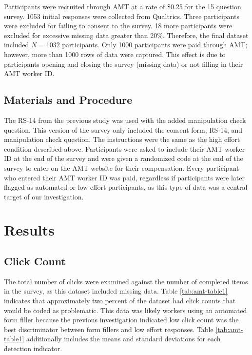 \documentclass[english,man]{apa6}
\theoremstyle{definition}
\theoremstyle{definition}
\theoremstyle{definition}
\theoremstyle{remark}
\begin{document}
Participants were recruited through AMT at a rate of \$0.25 for the 15
question survey. 1053 initial responses were collected from Qualtrics.
Three participants were excluded for failing to consent to the survey.
18 more participants were excluded for excessive missing data greater
than 20\%. Therefore, the final dataset included \emph{N} = 1032
participants. Only 1000 participants were paid through AMT; however,
more than 1000 rows of data were captured. This effect is due to
participants opening and closing the survey (missing data) or not
filling in their AMT worker ID.

\subsection{Materials and Procedure}\label{materials-and-procedure}

The RS-14 from the previous study was used with the added manipulation
check question. This version of the survey only included the consent
form, RS-14, and manipulation check question. The instructions were the
same as the high effort condition described above. Participants were
asked to include their AMT worker ID at the end of the survey and were
given a randomized code at the end of the survey to enter on the AMT
website for their compensation. Every participant who entered their AMT
worker ID was paid, regardless if participants were later flagged as
automated or low effort participants, as this type of data was a central
target of our investigation.

\section{Results}\label{results-2}

\subsection{Click Count}\label{click-count-2}

The total number of clicks were examined against the number of completed
items in the survey, as this dataset included missing data. Table
\ref{tab:amt-table1} indicates that approximately two percent of the
dataset had click counts that would be coded as problematic. This data
was likely workers using an automated form filler because the previous
investigation indicated low click count was the best discriminator
between form fillers and low effort responses. Table
\ref{tab:amt-table1} additionally includes the means and standard
deviations for each detection indicator.
\end{document}
